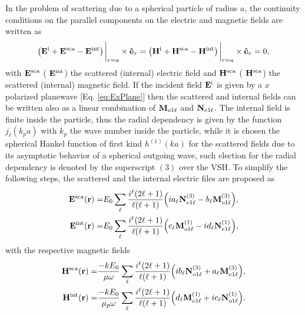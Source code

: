 In the problem of scattering due to a spherical particle of radius $a$, the continuity conditions on the parallel components on the electric and magnetic fields are written as
 \begin{align}
 \qty(\vb{E}^\text{i} + \vb{E}^\text{sca}- \vb{E}^\text{int})\eval_{r=a}\times \vu{e}_r  =
  \qty(\vb{H}^\text{i} + \vb{H}^\text{sca} - \vb{H}^\text{int})\eval_{r=a} \times\vu{e}_r = 0,
  \label{eq:contuinity}
 \end{align}
with  $\vb{E}^\text{sca}$ ( $\vb{E}^\text{int}$) the scattered (internal) electric field and  $\vb{H}^\text{sca}$ ( $\vb{H}^\text{sca}$) the scattered (internal) magnetic field. If the incident field $\vb{E}^\text{i}$ is given by a $x$ polarized planewave [Eq. \eqref{eq:ExPlane}] then the scattered and internal fields can be written also as a linear combination of $\vb{M}_{o1\ell}$ and $\vb{N}_{e1\ell}$. The internal field is finite inside the particle, thus the radial dependency is given by the function $j_\ell(k_p a)$ with $k_p$ the wave number inside the particle, while it is chosen the spherical Hankel function of first kind $h^{(1)}(ka)$  for the scattered fields due to its asymptotic behavior of a spherical outgoing wave, such election for the radial dependency is denoted by the superscript $(3)$ over the VSH. To simplify the following steps, the scattered and the internal electric files are proposed as
  \begin{subequations}
 \begin{align}
 \vb{E}^\text{sca} (\vb{r})=& E_0 \sum_\ell\frac{i^\ell(2\ell+1)}{\ell(\ell+1)}\qty(i a_\ell \vb{N}_{e1\ell}^{(3)} -b_\ell \vb{M}_{o1\ell}^{(3)}),
 \label{eq:EscaLC}\\
 \vb{E}^\text{int} (\vb{r})=& E_0 \sum_\ell\frac{i^\ell(2\ell+1)}{\ell(\ell+1)}\qty( c_\ell\vb{M}_{o1\ell}^{(1)} - i d_\ell \vb{N}_{e1\ell}^{(1)}),
 \end{align}
 \label{eq:EscaInt}
 \end{subequations}
with the respective magnetic fields
    \begin{subequations}
 \begin{align}
 \vb{H}^\text{sca} (\vb{r})=& \frac{-kE_0}{\mu\omega} \sum_\ell\frac{i^\ell(2\ell+1)}{\ell(\ell+1)}\qty(i b_\ell \vb{N}_{o1\ell}^{(3)} +a_\ell \vb{M}_{e1\ell}^{(3)}),\\
 \vb{H}^\text{int} (\vb{r})=& \frac{-kE_0}{\mu_p\omega} \sum_\ell\frac{i^\ell(2\ell+1)}{\ell(\ell+1)}\qty( d_\ell\vb{M}_{e1\ell}^{(1)} + i c_\ell \vb{N}_{o1\ell}^{(1)}).
 \end{align}%
\label{eq:HscaInt}%
 \end{subequations}%
